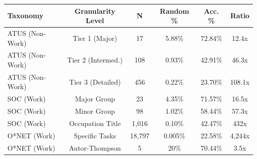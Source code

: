  \begin{tabular}{lccccc}
        \toprule
        \textbf{Taxonomy} & \textbf{Granularity Level} & \textbf{N} & \textbf{Random \% } & \textbf{Acc. \%} & \textbf{Ratio} \\
        \midrule
        ATUS (Non-Work) & Tier 1 (Major) & 17 & 5.88\% & 72.84\% & 12.4x \\
        ATUS (Non-Work) & Tier 2 (Intermed.) & 108 & 0.93\% & 42.91\% & 46.3x \\
        ATUS (Non-Work) & Tier 3 (Detailed) & 456 & 0.22\% & 23.70\% & 108.1x \\
        SOC (Work) & Major Group & 23 & 4.35\% & 71.57\% & 16.5x \\
        SOC (Work) & Minor Group & 98 & 1.02\% & 58.44\% & 57.3x \\
        SOC (Work) & Occupation Title & 1,016 & 0.10\% & 42.47\% & 432x \\
        O*NET (Work) & Specific Tasks & 18,797 & 0.005\% & 22.58\% & 4,244x \\
        O*NET (Work) & Autor-Thompson  & 5 & 20\% & 70.44\% & 3.5x \\
        \bottomrule
    \end{tabular}
    \vspace{0.2cm}